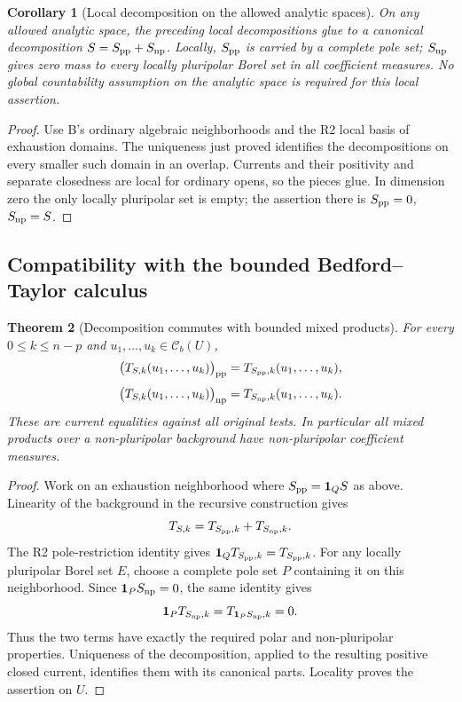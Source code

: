 \documentclass[11pt,a4paper]{article}
\numberwithin{equation}{section}
\newtheorem{theorem}{Theorem}[section]
\newtheorem{corollary}[theorem]{Corollary}
\theoremstyle{definition}
\theoremstyle{remark}
\newcommand{\Cb}{\mathcal C_b}
\begin{document}
\begin{corollary}[Local decomposition on the allowed analytic spaces]
\label{cor:r3-local-polar-decomposition}
On any allowed analytic space, the preceding local
decompositions glue to a canonical decomposition
$S=S_{\rm pp}+S_{\rm np}$. Locally, $S_{\rm pp}$ is carried
by a complete pole set; $S_{\rm np}$ gives zero mass to
every locally pluripolar Borel set in all coefficient measures.
No global countability assumption on the analytic space is
required for this local assertion.
\end{corollary}

\begin{proof}
Use B's ordinary algebraic neighborhoods and the R2 local
basis of exhaustion domains. The uniqueness just proved
identifies the decompositions on every smaller such domain
in an overlap. Currents and their positivity and separate
closedness are local for ordinary opens, so the pieces glue.
In dimension zero the only locally pluripolar set is empty;
the assertion there is $S_{\rm pp}=0$, $S_{\rm np}=S$.
\end{proof}

\subsection{Compatibility with the bounded Bedford--Taylor calculus}

\begin{theorem}[Decomposition commutes with bounded mixed products]
\label{thm:r3-polar-decomposition-bt}
For every $0\leq k\leq n-p$ and $u_1,\ldots,u_k\in\Cb(U)$,
\[
 \bigl(T_{S,k}(u_1,\ldots,u_k)\bigr)_{\rm pp}
       =T_{S_{\rm pp},k}(u_1,\ldots,u_k),
\]
\[
 \bigl(T_{S,k}(u_1,\ldots,u_k)\bigr)_{\rm np}
       =T_{S_{\rm np},k}(u_1,\ldots,u_k).
\]
These are current equalities against all original tests.
In particular all mixed products over a non-pluripolar
background have non-pluripolar coefficient measures.
\end{theorem}

\begin{proof}
Work on an exhaustion neighborhood where
$S_{\rm pp}=\mathbf1_QS$ as above. Linearity of the
background in the recursive construction gives
\[
 T_{S,k}=T_{S_{\rm pp},k}+T_{S_{\rm np},k}.
\]
The R2 pole-restriction identity gives
$\mathbf1_QT_{S_{\rm pp},k}=T_{S_{\rm pp},k}$.
For any locally pluripolar Borel set $E$, choose a complete
pole set $P$ containing it on this neighborhood. Since
$\mathbf1_PS_{\rm np}=0$, the same identity gives
\[
 \mathbf1_PT_{S_{\rm np},k}
      =T_{\mathbf1_PS_{\rm np},k}=0.
\]
Thus the two terms have exactly the required polar and
non-pluripolar properties. Uniqueness of the decomposition,
applied to the resulting positive closed current, identifies
them with its canonical parts. Locality proves the assertion
on $U$.
\end{proof}
\end{document}
